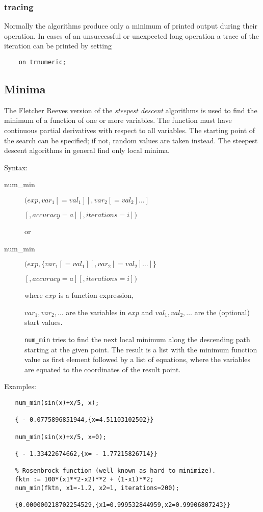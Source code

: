 \subsubsection{tracing}
Normally the algorithms produce only a minimum of printed
output during their operation. In cases of an unsuccessful
or unexpected long operation a trace of the iteration can be
printed by setting
\begin{verbatim}
    on trnumeric;
\end{verbatim}


\subsection{Minima}
\hypertarget{operator:NUM_MIN}{}

The Fletcher Reeves version of the \emph{steepest descent}
algorithms is used to find the minimum of a
function of one or more variables. The
function must have continuous partial derivatives with respect to all
variables. The starting point of the search can be
specified; if not, random values are taken instead.
The steepest descent algorithms in general find only local
minima.

Syntax:
\begin{description}
\item[num\_min] $(exp, var_1[=val_1] [,var_2[=val_2] \ldots]$

$             [,accuracy=a][,iterations=i]) $

or

\item[num\_min] $(exp, \{ var_1[=val_1] [,var_2[=val_2] \ldots] \}$

$             [,accuracy=a][,iterations=i]) $


where $exp$ is a function expression,

$var_1, var_2, \ldots$ are the variables in $exp$ and
$val_1,val_2, \ldots$ are the (optional) start values.

\texttt{num\_min} tries to find the next local minimum along the descending
path starting at the given point. The result is a list
with the minimum function value as first element followed by a list
of equations, where the variables are equated to the coordinates
of the result point.
\end{description}

Examples:
\begin{verbatim}
   num_min(sin(x)+x/5, x);

   { - 0.0775896851944,{x=4.51103102502}}

   num_min(sin(x)+x/5, x=0);

   { - 1.33422674662,{x= - 1.77215826714}}

   % Rosenbrock function (well known as hard to minimize).
   fktn := 100*(x1**2-x2)**2 + (1-x1)**2;
   num_min(fktn, x1=-1.2, x2=1, iterations=200);

   {0.000000218702254529,{x1=0.999532844959,x2=0.99906807243}}

\end{verbatim}


